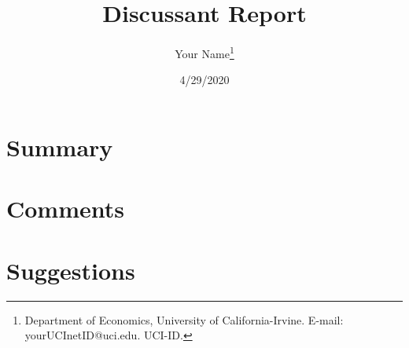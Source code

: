\documentclass[12pt, letterpaper, oneside]{article}
\title{Discussant Report}
\author{Your Name\footnote{Department of Economics, University of California-Irvine. E-mail: yourUCInetID@uci.edu. UCI-ID.}}
\date{4/29/2020}
\begin{document}
\doublespacing
\maketitle

\lipsum[10]

\section{Summary}

\lipsum[11-12]

\section{Comments}

\lipsum[15]

\section{Suggestions}

\lipsum[20]
\end{document}
